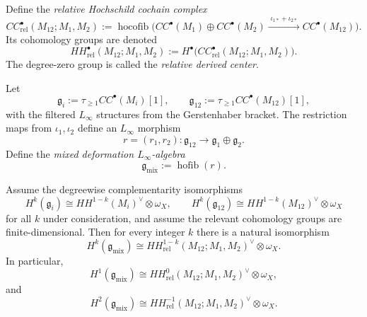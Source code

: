\begin{definition}
\label{def:relative-hochschild-cochains}
Define the \emph{relative Hochschild cochain complex}
\[
CC^\bullet_{\mathrm{rel}}(M_{12};M_1,M_2)
:=
\operatorname{hocofib}\!\Big(
CC^\bullet(M_1)\oplus CC^\bullet(M_2)
\xrightarrow{\;\iota_{1*}+\iota_{2*}\;}
CC^\bullet(M_{12})
\Big).
\]
Its cohomology groups are denoted
\[
HH^\bullet_{\mathrm{rel}}(M_{12};M_1,M_2)
:= H^\bullet\big(CC^\bullet_{\mathrm{rel}}(M_{12};M_1,M_2)\big).
\]
The degree-zero group is called the \emph{relative derived center}.
\end{definition}

\begin{definition}
\label{def:mixed-deformation-linfty-relative}
Let
\[
\mathfrak g_i:=\tau_{\ge 1}CC^\bullet(M_i)[1],
\qquad
\mathfrak g_{12}:=\tau_{\ge 1}CC^\bullet(M_{12})[1],
\]
with the filtered $L_\infty$ structures from the Gerstenhaber bracket. The restriction maps from $\iota_1,\iota_2$ define an $L_\infty$ morphism
\[
r=(r_1,r_2):\mathfrak g_{12}\to \mathfrak g_1\oplus \mathfrak g_2.
\]
Define the \emph{mixed deformation $L_\infty$-algebra}
\[
\mathfrak g_{\mathrm{mix}}:=\operatorname{hofib}(r).
\]
\end{definition}

\begin{theorem}
\label{thm:relative-duality-theorem}
Assume the degreewise complementarity isomorphisms
\[
H^k(\mathfrak g_i)
\cong
HH^{1-k}(M_i)^\vee\otimes \omega_X,
\qquad
H^k(\mathfrak g_{12})
\cong
HH^{1-k}(M_{12})^\vee\otimes \omega_X
\]
for all $k$ under consideration, and assume the relevant cohomology groups are finite-dimensional. Then for every integer $k$ there is a natural isomorphism
\[
H^k(\mathfrak g_{\mathrm{mix}})
\cong
HH^{1-k}_{\mathrm{rel}}(M_{12};M_1,M_2)^\vee\otimes \omega_X.
\]
In particular,
\[
H^1(\mathfrak g_{\mathrm{mix}})
\cong
HH^{0}_{\mathrm{rel}}(M_{12};M_1,M_2)^\vee\otimes \omega_X,
\]
and
\[
H^2(\mathfrak g_{\mathrm{mix}})
\cong
HH^{-1}_{\mathrm{rel}}(M_{12};M_1,M_2)^\vee\otimes \omega_X.
\]
\end{theorem}


